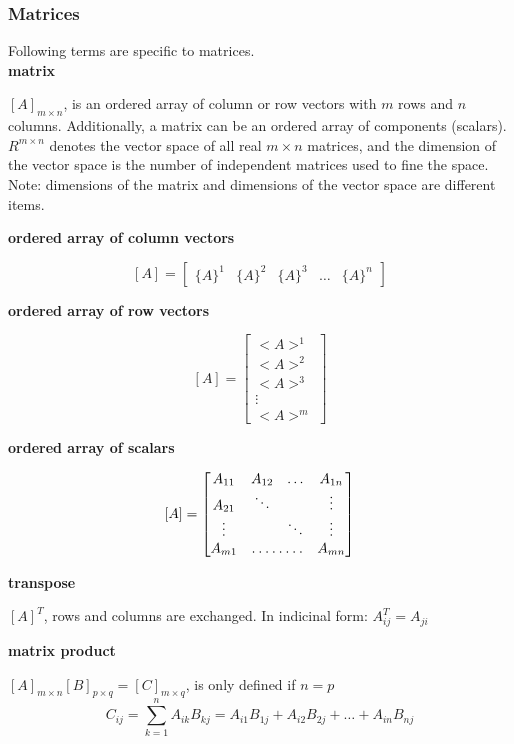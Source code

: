 \documentclass[letterpaper,reqno,oneside]{amsart}
\newenvironment{dd}[1]{
	\noindent
	\textbf{\normalsize{#1}}
	\hspace{0.1in}
	\small
	\rmfamily
	}
	{\medskip}
\begin{document}
\subsubsection{Matrices\\}
Following terms are specific to matrices.\\

\begin{dd}{matrix}
$[A]_{m\times n}$, is an ordered array of column or row vectors with $m$ rows and $n$ columns.  Additionally, a matrix can be an ordered array of components (scalars). $R^{m\times n}$ denotes the vector space of all real $m \times n$ matrices, and the dimension of the vector space is the number of independent matrices used to fine the space. Note: dimensions of the matrix and dimensions of the vector space are different items.
\end{dd}


\begin{dd}{ordered array of column vectors}
	\[ [A] =
	\begin{bmatrix}
	\{A\}^1 & \{A\}^2 & \{A\}^3 & \hdots & \{A\}^n 
	\end{bmatrix}
	\]
\end{dd}

\begin{dd}{ordered array of row vectors}
	\[ [A] =
	\begin{bmatrix}
	<A>^1 \\ <A>^2 \\ <A>^3 \\ \vdots \\ <A>^m 
	\end{bmatrix}
	\]
\end{dd}

\begin{dd}{ordered array of scalars}
	\[ [A] =
	\begin{bmatrix}
	A_{11} & A_{12} & \hdots & A_{1n} \\
	A_{21} & \ddots & & \vdots\\
	\vdots & & \ddots & \vdots\\
	A_{m1} & \hdotsfor{2} & A_{mn}
	\end{bmatrix}
	\]
\end{dd}

\begin{dd}{transpose}
$[A]^T$, rows and columns are exchanged. In indicinal form: $A_{ij}^T = A_{ji}$
\end{dd}

\begin{dd}{matrix product}
$[A]_{m \times n} [B]_{p \times q}=[C]_{m \times q}$, is only defined if $n = p$
$$C_{ij} = \sum_{k=1}^n A_{ik}B_{kj} = A_{i1}B_{1j}+ A_{i2}B_{2j} + \hdots + A_{in}B_{nj}$$
\end{dd}
\end{document}
